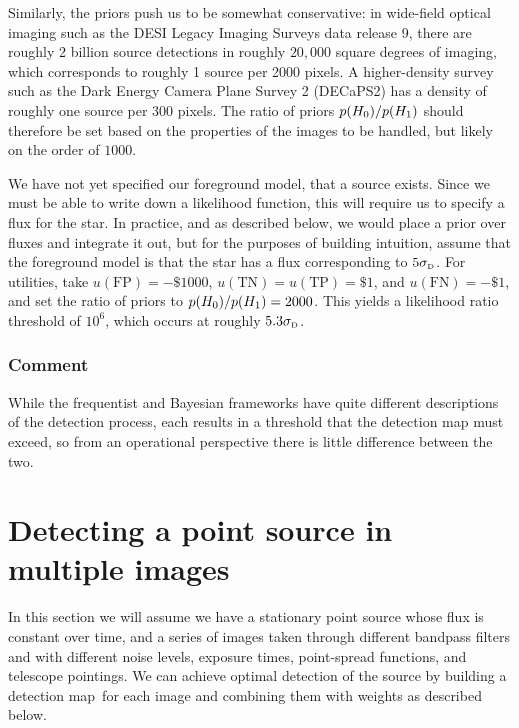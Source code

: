 \documentclass[11pt,letterpaper,linenumbers]{aastex63}
\newcommand{\detmap}{detection map}
\newcommand{\sigd}{\sigma_{\mbox{\rmfamily\tiny D}}}
\newcommand{\truepos}{\ensuremath{\mathrm{TP}}}
\newcommand{\falsepos}{\ensuremath{\mathrm{FP}}}
\newcommand{\trueneg}{\ensuremath{\mathrm{TN}}}
\newcommand{\falseneg}{\ensuremath{\mathrm{FN}}}
\begin{document}
Similarly, the priors push us to be somewhat conservative: in
wide-field optical imaging such as the DESI Legacy Imaging Surveys
\citep{lsoverview} data release 9, there are roughly 2 billion source
detections in roughly $20,000$ square degrees of imaging, which
corresponds to roughly 1 source per 2000 pixels.  A higher-density
survey such as the Dark Energy Camera Plane Survey 2 (DECaPS2)
\citep{decaps2} has a density of roughly one source per 300 pixels.
The ratio of priors $p(H_0) / p(H_1)$ should therefore be set based on
the properties of the images to be handled, but likely on the order of
$1000$.

We have not yet specified our foreground model, that a source exists.
Since we must be able to write down a likelihood function, this will
require us to specify a flux for the star.  In practice, and as
described below, we would place a prior over fluxes and integrate it
out, but for the purposes of building intuition, assume that the
foreground model is that the star has a flux corresponding to
$5 \sigd$.  For utilities, take $u(\falsepos) = -\$1000$, 
$u(\trueneg) = u(\truepos) = \$1$, and $u(\falseneg) = -\$1$, and
set the ratio of priors to $p(H_0)/p(H_1) = 2000$.
This yields a likelihood ratio threshold of $10^6$, which occurs at
roughly $5.3 \sigd$.


\subsubsection{Comment}


While the frequentist and Bayesian frameworks have quite different
descriptions of the detection process, each results in a threshold
that the detection map must exceed, so from an operational perspective
there is little difference between the two.


\section{Detecting a point source in multiple images}

In this section we will assume we have a stationary point source whose
flux is constant over time, and a series of images taken through
different bandpass filters and with different noise levels, exposure
times, point-spread functions, and telescope pointings.  We can
achieve optimal detection of the source by building a \detmap\ for
each image and combining them with weights as described below.
\end{document}
